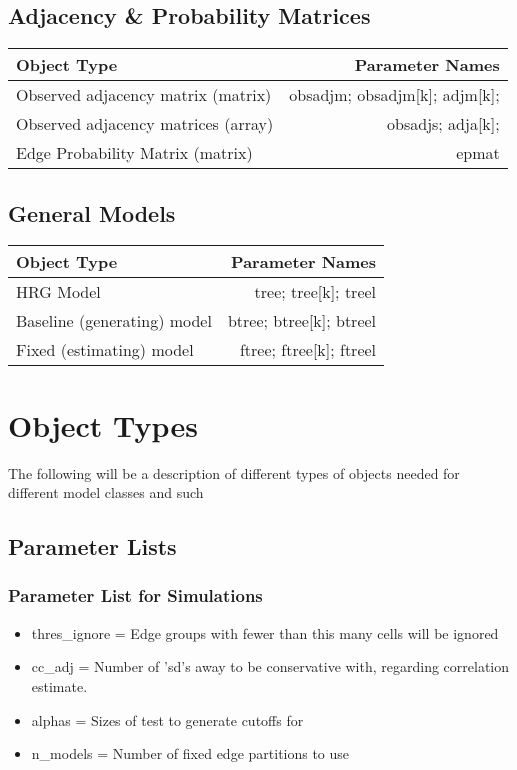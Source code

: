 \documentclass[11pt]{article}
\begin{document}
\subsection{Adjacency \& Probability Matrices}
\begin{tabular}{|l|r|}
\hline
{\bf Object Type} & {\bf Parameter Names} \\


\hline
Observed adjacency matrix (matrix) & obsadjm; obsadjm[k]; adjm[k];\\

\hline 
Observed adjacency matrices (array) & obsadjs; adja[k]; \\

\hline
Edge Probability Matrix (matrix) & epmat \\

\hline
\end{tabular}

\subsection{General Models}
\begin{tabular}{|l|r|}
\hline
{\bf Object Type} & {\bf Parameter Names} \\


\hline
HRG Model & tree; tree[k]; treel \\
\hline
Baseline (generating) model & btree; btree[k]; btreel \\
\hline
Fixed (estimating) model & ftree; ftree[k]; ftreel \\

\hline
\end{tabular}


\section{Object Types}
The following will be a description of different types of objects needed for different model classes and such

\subsection{Parameter Lists}
\subsubsection{Parameter List for Simulations}
\begin{itemize}
\item thres\_ignore = Edge groups with fewer than this many cells will be ignored
\item cc\_adj = Number of 'sd's away to be conservative with, regarding correlation estimate. 
\item alphas = Sizes of test to generate cutoffs for
\item n\_models = Number of fixed edge partitions to use

\end{itemize}
\end{document}
